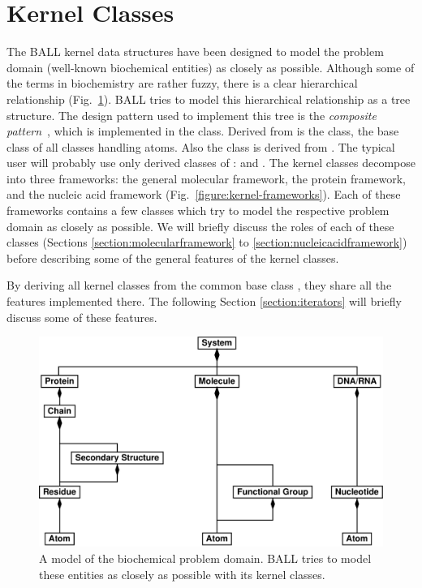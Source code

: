 \section{Kernel Classes}
\label{section:kernelclasses}

The BALL kernel data structures have been designed to model the problem 
domain (\ie well-known biochemical entities) as closely as possible.
Although some of the terms in biochemistry are rather fuzzy, there is a clear
hierarchical relationship (Fig.~\ref{figure:problem-domain}).
BALL tries to model this hierarchical relationship as a tree structure.
The design pattern used to implement this tree is the {\em composite
pattern}~\cite{DesignPatterns}, which is implemented in the 
class. Derived from  is the  class, the
base class of all classes handling atoms. Also the  class is 
derived from . The typical user will probably use only derived
classes of :  and . The kernel
classes decompose into three frameworks: the general molecular framework, the 
protein framework, and the nucleic acid framework 
(Fig.~\ref{figure:kernel-frameworks}).
Each of these frameworks contains a few classes which try to model the
respective problem domain as closely as possible. We will briefly discuss the
roles of each of these classes (Sections \ref{section:molecularframework} to
\ref{section:nucleicacidframework}) before describing some of the general 
features of the kernel classes.

By deriving all kernel classes from the common base class ,
they share all the features implemented there. The following Section 
\ref{section:iterators} will briefly discuss some of these features.

\begin{figure}[tb]
  \centering\includegraphics[width=\textwidth]{problem-domain}
  \caption{A model of the biochemical problem domain. BALL tries to model
           these entities as closely as possible with its kernel classes.}
  \label{figure:problem-domain}
\end{figure}

